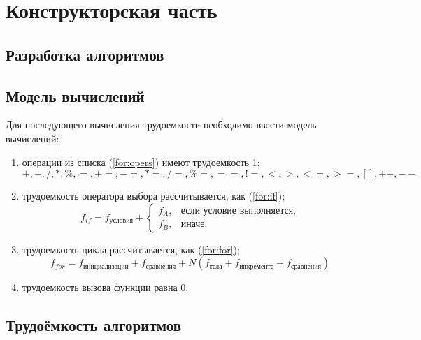\chapter{Конструкторская часть}

\section{Разработка алгоритмов}


\clearpage
{}

\section{Модель вычислений}

Для последующего вычисления трудоемкости необходимо ввести модель вычислений:
\begin{enumerate}
    \item операции из списка (\ref{for:opers}) имеют трудоемкость 1;
        \begin{equation}
            \label{for:opers}
            +, -, /, *, \%, =, +=, -=, *=, /=, \%=, ==, !=, <, >, <=, >=, [], ++, {-}-
        \end{equation}
    \item трудоемкость оператора выбора  рассчитывается, как (\ref{for:if});
	\begin{equation}
        \label{for:if}
        f_{if} = f_{\text{условия}} +
        \begin{cases}
        f_A, & \text{если условие выполняется,}\\
        f_B, & \text{иначе.}
        \end{cases}
	\end{equation}
\item трудоемкость цикла рассчитывается, как (\ref{for:for});
    \begin{equation}
        \label{for:for}
        f_{for} = f_{\text{инициализации}} + f_{\text{сравнения}} + N(f_{\text{тела}} + f_{\text{инкремента}} + f_{\text{сравнения}})
    \end{equation}
	\item трудоемкость вызова функции равна 0.
\end{enumerate}


\section{Трудоёмкость алгоритмов}


